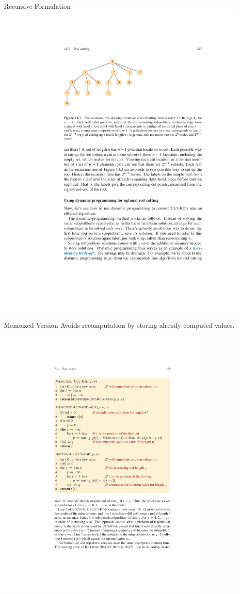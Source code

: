 \documentclass[aspectratio=169]{beamer}
\begin{document}
\begin{frame}{Recursive Formulation}
    \centering
    \includegraphics[width=0.95\textwidth,clip=true,trim=5cm 19cm 8cm 4cm]{figures/p367}
\end{frame}

\begin{frame}{Memoized Version}
    Avoids recomputation by storing already computed values.

    \centering
    \includegraphics[width=0.8\textwidth,clip=true,trim=5cm 15.5cm 3cm 4cm]{figures/p369}
\end{frame}
\end{document}
